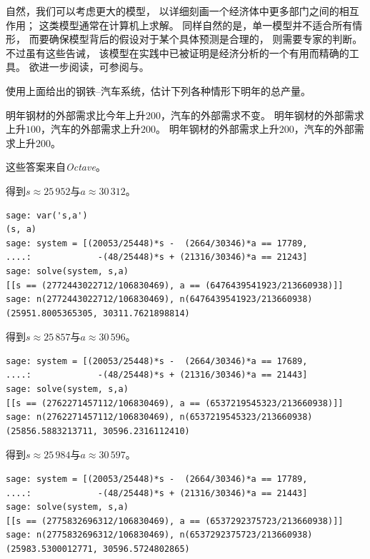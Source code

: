 自然，我们可以考虑更大的模型，
以详细刻画一个经济体中更多部门之间的相互作用；
这类模型通常在计算机上求解。
同样自然的是，单一模型并不适合所有情形，
而要确保模型背后的假设对于某个具体预测是合理的，
则需要专家的判断。
不过虽有这些告诫，
该模型在实践中已被证明是经济分析的一个有用而精确的工具。
欲进一步阅读，可参阅\cite{Leontief1951}与\cite{Leontief1965}。 

\begin{exercises}
  \item 
    使用上面给出的钢铁–汽车系统，估计下列各种情形下明年的总产量。
    \begin{exparts}
      \partsitem 明年钢材的外部需求比今年上升$200$，汽车的外部需求不变。
      \partsitem 明年钢材的外部需求上升$100$，汽车的外部需求上升$200$。
      \partsitem 明年钢材的外部需求上升$200$，汽车的外部需求上升$200$。
    \end{exparts} 
    \begin{answer}
      这些答案来自\textit{Octave}。
      \begin{exparts}
        \partsitem \Sage{} 得到$s\approx 25\,952$与$a\approx 30\,312$。
\begin{lstlisting}
sage: var('s,a')
(s, a)
sage: system = [(20053/25448)*s -  (2664/30346)*a == 17789,
....:             -(48/25448)*s + (21316/30346)*a == 21243]
sage: solve(system, s,a)
[[s == (2772443022712/106830469), a == (6476439541923/213660938)]]
sage: n(2772443022712/106830469), n(6476439541923/213660938)
(25951.8005365305, 30311.7621898814)          
\end{lstlisting}
        \partsitem \Sage{} 得到$s\approx 25\,857$与$a\approx 30\,596$。
\begin{lstlisting}
sage: system = [(20053/25448)*s -  (2664/30346)*a == 17689,
....:             -(48/25448)*s + (21316/30346)*a == 21443]
sage: solve(system, s,a)
[[s == (2762271457112/106830469), a == (6537219545323/213660938)]]
sage: n(2762271457112/106830469), n(6537219545323/213660938)
(25856.5883213711, 30596.2316112410)
\end{lstlisting}
        \partsitem \Sage{} 得到$s\approx 25\,984$与$a\approx 30\,597$。
\begin{lstlisting}
sage: system = [(20053/25448)*s -  (2664/30346)*a == 17789,
....:             -(48/25448)*s + (21316/30346)*a == 21443]
sage: solve(system, s,a)
[[s == (2775832696312/106830469), a == (6537292375723/213660938)]]
sage: n(2775832696312/106830469), n(6537292375723/213660938)
(25983.5300012771, 30596.5724802865)          
\end{lstlisting}

\end{exparts}
\end{answer}
\end{exercises}
